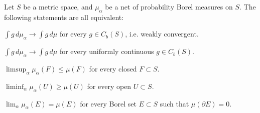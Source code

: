 \documentclass[a4paper]{article}
\begin{document}
\begin{lem}
Let $S$ be a metric space, and $\mu_\alpha$ be a net of probability Borel measures on $S$.
The following statements are all equivalent:
\begin{parts}
\item $\int g\,d\mu_\alpha\to\int g\,d\mu$ for every $g\in C_b(S)$, i.e. weakly convergent.
\item $\int g\,d\mu_\alpha\to\int g\,d\mu$ for every uniformly continuous $g\in C_b(S)$.
\item $\limsup_{\alpha}\mu_\alpha(F)\le\mu(F)$ for every closed $F\subset S$.
\item $\liminf_{\alpha}\mu_\alpha(U)\ge\mu(U)$ for every open $U\subset S$.
\item $\lim_{\alpha}\mu_\alpha(E)=\mu(E)$ for every Borel set $E\subset S$ such that $\mu(\partial E)=0$.
\end{parts}
\end{lem}
\end{document}
